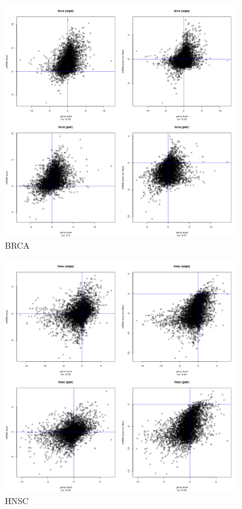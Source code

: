 \documentclass[a4paper,12pt]{article}
\begin{document}
\newpage

\begin{figure}[!h] 
\centering 
\includegraphics[width=0.9\textwidth]{plots/gene_vs_mirna_level_gsa_brca.png} 
\caption{BRCA} 
\end{figure} 

\newpage

\begin{figure}[!h] 
\centering 
\includegraphics[width=0.9\textwidth]{plots/gene_vs_mirna_level_gsa_hnsc.png} 
\caption{HNSC} 
\end{figure} 
\end{document}
